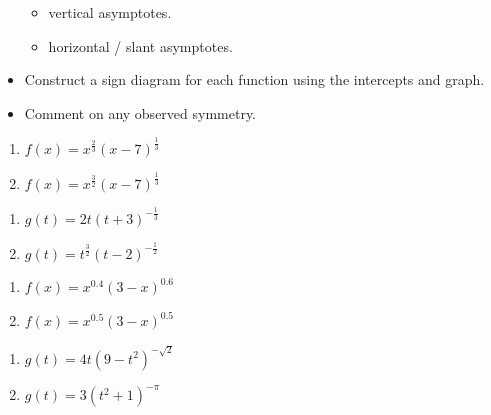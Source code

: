 \documentclass{ximera}
\begin{document}
\begin{itemize}
\begin{multicols}{2}
\begin{itemize}
\item  vertical asymptotes.

\item  horizontal / slant asymptotes.

\end{itemize}

\end{multicols}

\item Construct a sign diagram for each function using the intercepts and graph.

\item  Comment on any observed symmetry.


\end{itemize}


\begin{multicols}{2}
\begin{enumerate}
\setcounter{enumi}{\value{HW}}

\item $f(x) = x^{\frac{2}{3}}(x - 7)^{\frac{1}{3}}$  \label{powerfcngraphexfirst}
\item $f(x) = x^{\frac{3}{2}}(x - 7)^{\frac{1}{3}}$ 


\setcounter{HW}{\value{enumi}}
\end{enumerate}
\end{multicols}

\begin{multicols}{2}
\begin{enumerate}
\setcounter{enumi}{\value{HW}}

\item $g(t) = 2t(t+3)^{-\frac{1}{3}}$ 
\item $g(t) = t^{\frac{3}{2}}(t-2)^{-\frac{1}{2}}$ 


\setcounter{HW}{\value{enumi}}
\end{enumerate}
\end{multicols}

\begin{multicols}{2}
\begin{enumerate}
\setcounter{enumi}{\value{HW}}

\item $f(x) = x^{0.4} (3-x)^{0.6}$ 
\item $f(x) = x^{0.5} (3-x)^{0.5}$ 


\setcounter{HW}{\value{enumi}}
\end{enumerate}
\end{multicols}

\begin{multicols}{2}
\begin{enumerate}
\setcounter{enumi}{\value{HW}}

\item $g(t) = 4t (9-t^2)^{-\sqrt{2}}$ 
\item $g(t) = 3(t^2+1)^{-\pi}$  \label{powerfcngraphexlast}


\setcounter{HW}{\value{enumi}}
\end{enumerate}
\end{multicols}
\end{document}
